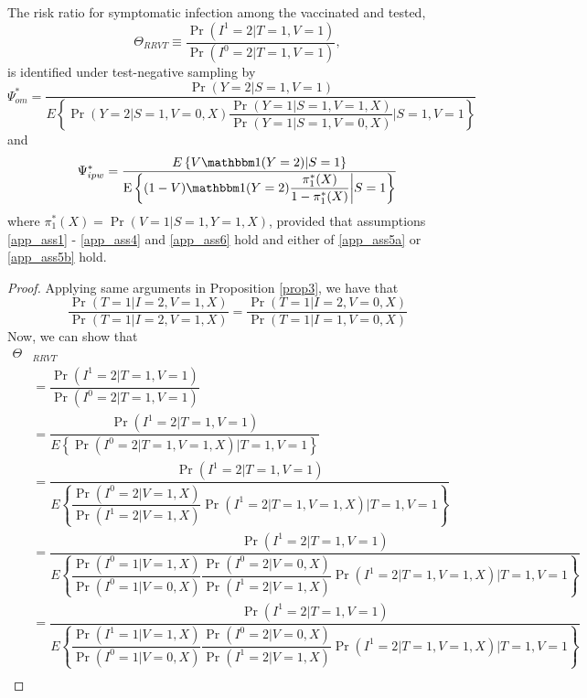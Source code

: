 \begin{appendix}
\begin{refsection}
    
    \newpage
    \begin{proposition}\label{prop4}
    The risk ratio for symptomatic infection among the vaccinated and tested, 
    \[\Theta_{RRVT} \equiv \dfrac{\Pr(I^1 = 2 | T = 1, V = 1)}{\Pr(I^0 = 2| T = 1, V = 1)},\]
    is identified under test-negative sampling by
   \begin{equation*}
        \Psi_{om}^* = \dfrac{\Pr(Y = 2 | S = 1, V = 1)}{E\left\{ \Pr(Y = 2 | S = 1, V = 0, X) \dfrac{\Pr(Y = 1 | S = 1, V = 1, X)}{\Pr(Y = 1| S = 1, V = 0, X)}\Big| S = 1, V = 1 \right\}}
    \end{equation*}
    and 
    \begin{equation*}
        \Psi_{ipw}^* = \dfrac{E\left\{V \mathbbm 1 (Y = 2)|S =1\right\}}{\E\left\{ (1 - V) \mathbbm 1 (Y = 2) \dfrac{\pi^*_1(X)}{1 - \pi^*_1(X)} \bigg| S = 1\right\}}
    \end{equation*}
    where $\pi^*_1(X) = \Pr(V = 1| S = 1, Y = 1, X)$, provided that assumptions \ref{app_ass1} - \ref{app_ass4} and \ref{app_ass6} hold and either of \ref{app_ass5a} or \ref{app_ass5b} hold.
    \end{proposition}
    \begin{proof}
        Applying same arguments in Proposition \ref{prop3}, we have that 
        \[\dfrac{\Pr(T = 1 | I = 2, V = 1, X)}{\Pr(T = 1 | I = 2, V = 1, X)}= \dfrac{\Pr(T = 1 | I = 2, V = 0, X)}{\Pr(T = 1 | I = 1, V = 0, X)}\]        
        Now, we can show that
        \begin{align*}
            \Theta&_{RRVT} \\
            &= \dfrac{\Pr(I^1 = 2 | T = 1, V = 1)}{\Pr(I^0 = 2| T = 1, V = 1)} \\
            &= \dfrac{\Pr(I^1 = 2 | T = 1, V = 1)}{E\left\{\Pr(I^0 = 2| T = 1, V = 1, X)\Big| T = 1, V = 1\right\}} \\
            &= \dfrac{\Pr(I^1 = 2 | T = 1, V = 1)}{E\left\{\dfrac{\Pr(I^0 = 2 | V = 1, X)}{\Pr(I^1 = 2 | V = 1, X)}\Pr(I^1 = 2| T = 1, V = 1, X)\Big| T = 1, V = 1\right\}} \\
            &= \dfrac{\Pr(I^1 = 2 | T = 1, V = 1)}{E\left\{\dfrac{\Pr(I^0 = 1| V = 1, X)}{\Pr(I^0 = 1| V = 0, X)}\dfrac{\Pr(I^0 = 2 | V = 0, X)}{\Pr(I^1 = 2 | V = 1, X)}\Pr(I^1 = 2| T = 1, V = 1, X)\Big| T = 1, V = 1\right\}} \\
            &= \dfrac{\Pr(I^1 = 2 | T = 1, V = 1)}{E\left\{\dfrac{\Pr(I^1 = 1| V = 1, X)}{\Pr(I^0 = 1| V = 0, X)}\dfrac{\Pr(I^0 = 2 | V = 0, X)}{\Pr(I^1 = 2 | V = 1, X)}\Pr(I^1 = 2| T = 1, V = 1, X)\Big| T = 1, V = 1\right\}} \\

\end{align*}
\end{proof}
\end{refsection}
\end{appendix}
